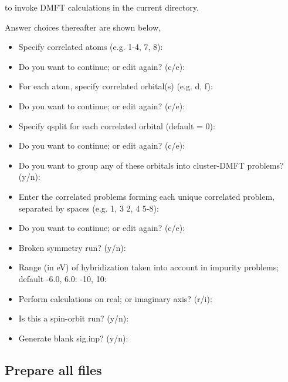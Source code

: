 \documentclass[12 pt]{article}
\begin{document}
  to invoke DMFT calculations in the current directory.

  Answer choices thereafter are shown below, 

  \begin{itemize}

    \item Specify correlated atoms (e.g. 1-4, 7, 8):

    \item Do you want to continue; or edit again? (c/e):

    \item For each atom, specify correlated orbital(s) (e.g. d, f):

    \item Do you want to continue; or edit again? (c/e):

    \item Specify qsplit for each correlated orbital (default = 0):  

    \item Do you want to continue; or edit again? (c/e):

    \item Do you want to group any of these orbitals into cluster-DMFT problems? (y/n):

    \item Enter the correlated problems forming each unique correlated problem, separated by spaces (e.g. 
1, 3 2, 4 5-8):

    \item Do you want to continue; or edit again? (c/e):

    \item Broken symmetry run? (y/n):

    \item Range (in eV) of hybridization taken into account in impurity problems; default -6.0, 6.0: -10, 10:

    \item Perform calculations on real; or imaginary axis? (r/i):

    \item Is this a spin-orbit run? (y/n):

    \item Generate blank sig.inp? (y/n):

  \end{itemize}

  \cleardoublepage

      \subsection{Prepare all files}
\end{document}

